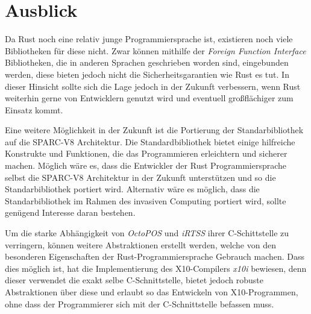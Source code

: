 \section{Ausblick}

Da Rust noch eine relativ junge Programmiersprache ist, existieren noch viele Bibliotheken für diese nicht.
Zwar können mithilfe der \textit{Foreign Function Interface} Bibliotheken,
die in anderen Sprachen geschrieben worden sind, eingebunden werden, diese bieten jedoch
nicht die Sicherheitsgarantien wie Rust es tut.
In dieser Hinsicht sollte sich die Lage jedoch in der Zukunft verbessern, wenn Rust
weiterhin gerne von Entwicklern genutzt wird und eventuell großflächiger zum Einsatz kommt.

Eine weitere Möglichkeit in der Zukunft ist die Portierung der Standarbibliothek auf die SPARC-V8 Architektur.
Die Standardbibliothek bietet einige hilfreiche Konstrukte und Funktionen,
die das Programmieren erleichtern und sicherer machen.
Möglich wäre es, dass die Entwickler der Rust Programmiersprache selbst die SPARC-V8 Architektur
in der Zukunft unterstützen und so die Standarbibliothek portiert wird. Alternativ wäre es möglich, dass die 
Standarbibliothek im Rahmen des invasiven Computing portiert wird, sollte genügend Interesse daran bestehen.

Um die starke Abhängigkeit von \textit{OctoPOS} und \textit{iRTSS} ihrer C-Schittstelle zu verringern,
können weitere Abstraktionen erstellt werden, welche von den
besonderen Eigenschaften der Rust-Programmiersprache Gebrauch machen.
Dass dies möglich ist, hat die Implementierung des X10-Compilers \textit{x10i} bewiesen,
denn dieser verwendet die exakt selbe C-Schnittstelle,
bietet jedoch robuste Abstraktionen über diese und erlaubt so
das Entwickeln von X10-Programmen, ohne dass der Programmierer sich mit der C-Schnittstelle befassen muss.
